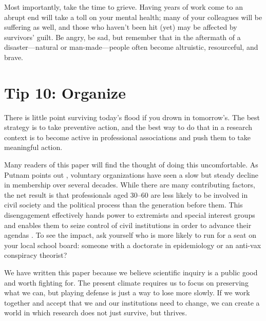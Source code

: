 \documentclass[10pt,letterpaper]{article}
\begin{document}
Most importantly,
take the time to grieve.
Having years of work come to an abrupt end will take a toll on your mental health;
many of your colleagues will be suffering as well,
and those who haven't been hit (yet) may be affected by survivors' guilt.
Be angry,
be sad,
but remember that in the aftermath of a disaster---natural or man-made---people
often become altruistic, resourceful, and brave.

\section*{Tip 10: Organize}

There is little point surviving today's flood if you drown in tomorrow's.
The best strategy is to take preventive action,
and the best way to do that in a research context
is to become active in professional associations
and push them to take meaningful action.

Many readers of this paper will find the thought of doing this uncomfortable.
As Putnam points out \cite{Putnam2020},
voluntary organizations have seen a slow but steady decline in membership over several decades.
While there are many contributing factors,
the net result is that professionals aged 30--60
are less likely to be involved in civil society and the political process than the generation before them.
This disengagement effectively hands power to extremists and special interest groups
and enables them to seize control of civil institutions in order to advance their agendas \cite{BuenoDeMesquita2022}.
To see the impact,
ask yourself who is more likely to run for a seat on your local school board:
someone with a doctorate in epidemiology or an anti-vax conspiracy theorist?

We have written this paper because we believe scientific inquiry is a public good and worth fighting for.
The present climate requires us to focus on preserving what we can,
but playing defense is just a way to lose more slowly.
If we work together and accept that we and our institutions need to change,
we can create a world in which research does not just survive,
but thrives.


\end{document}
